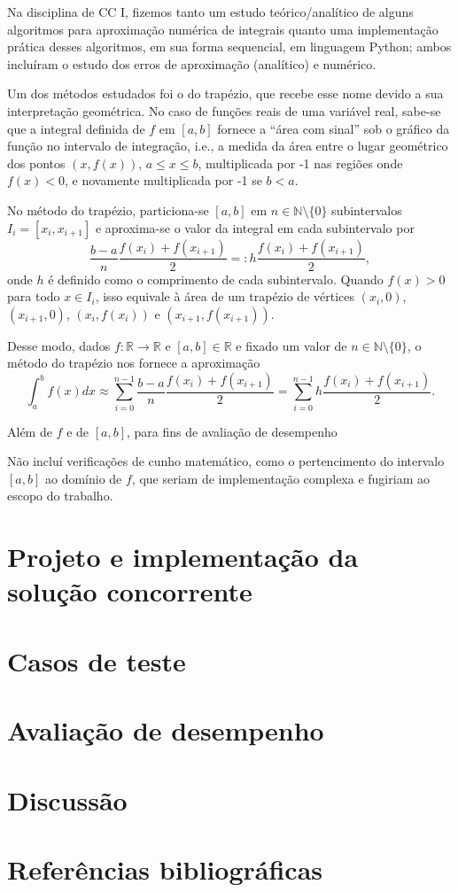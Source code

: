 \documentclass{article}
\newcommand{\R}{\mathbb{R}}
\newcommand{\N}{\mathbb{N}}
\begin{document}
  Na disciplina de CC I, fizemos tanto um estudo teórico/analítico de alguns algoritmos para aproximação numérica de integrais quanto uma implementação prática desses algoritmos, em sua forma sequencial, em linguagem Python; ambos incluíram o estudo dos erros de aproximação (analítico) e numérico. 
  
  Um dos métodos estudados foi o do trapézio, que recebe esse nome devido a sua interpretação geométrica. No caso de funções reais de uma variável real, sabe-se que a integral definida de $f$ em $[a, b]$ fornece a ``área com sinal'' sob o gráfico da função no intervalo de integração, i.e., a medida da área entre o lugar geométrico dos pontos $(x, f(x))$, $a \leq x \leq b$, multiplicada por -1 nas regiões onde $f(x) < 0$, e novamente multiplicada por -1 se $b < a$. 
  
  No método do trapézio, particiona-se $[a, b]$ em $n \in \N \setminus \{0\}$ subintervalos $I_i = [x_i, x_{i+1}]$ e aproxima-se o valor da integral em cada subintervalo por
  $$ \frac{b-a}{n} \frac{f(x_i) + f(x_{i+1})}{2} =: h \frac{f(x_i) + f(x_{i+1})}{2},$$\noindent
  onde $h$ é definido como o comprimento de cada subintervalo. Quando $f(x) > 0$ para todo $x \in I_i$, isso equivale à área de um trapézio de vértices $(x_i, 0)$, $(x_{i+1}, 0)$, $(x_i, f(x_i))$ e $(x_{i+1}, f(x_{i+1}))$.

  Desse modo, dados $f: \R \to \R$ e $[a, b] \in \R$ e fixado um valor de $n \in \N \setminus \{0\}$, o método do trapézio nos fornece a aproximação
  $$\int_a^b f(x) dx \approx \sum_{i=0}^{n-1} \frac{b-a}{n} \frac{f(x_i) + f(x_{i+1})}{2} = \sum_{i=0}^{n-1} h \frac{f(x_i) + f(x_{i+1})}{2}.$$


  Além de $f$ e de $[a, b]$, para fins de avaliação de desempenho 

  Não incluí verificações de cunho matemático, como o pertencimento do intervalo $[a, b]$ ao domínio de $f$, que seriam de implementação complexa e fugiriam ao escopo do trabalho.

  \section{Projeto e implementação da solução concorrente}

  \section{Casos de teste}

  \section{Avaliação de desempenho}

  \section{Discussão}

  \section{Referências bibliográficas}

  \printbibliography
\end{document}

